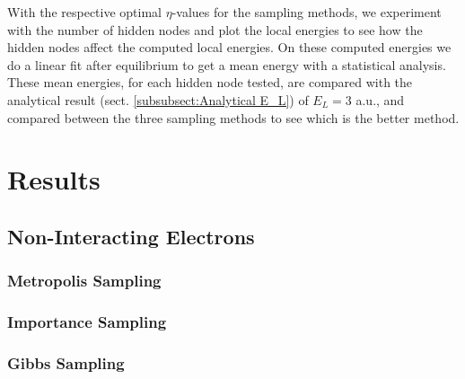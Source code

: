 \documentclass[12pt,a4paper,english]{article}
\begin{document}
With the respective optimal $\eta$-values for the sampling methods, we experiment with the number of hidden nodes and plot the local energies to see how the hidden nodes affect the computed local energies. On these computed energies we do a linear fit after equilibrium to get a mean energy with a statistical analysis. These mean energies, for each hidden node tested, are compared with the analytical result (sect. \ref{subsubsect:Analytical E_L}) of $E_L=3$ a.u., and compared between the three sampling methods to see which is the better method.


\section{Results}
\label{sect:Results}
\subsection{Non-Interacting Electrons}
\label{subsect:Results_nonint}
\subsubsection{Metropolis Sampling}
\label{subsubsect:Results_nonint_Metropolis}
\subsubsection{Importance Sampling}
\label{subsubsect:Results_nonint_Importance}
\subsubsection{Gibbs Sampling}
\label{subsubsect:Results_nonint_Gibbs}
\end{document}
